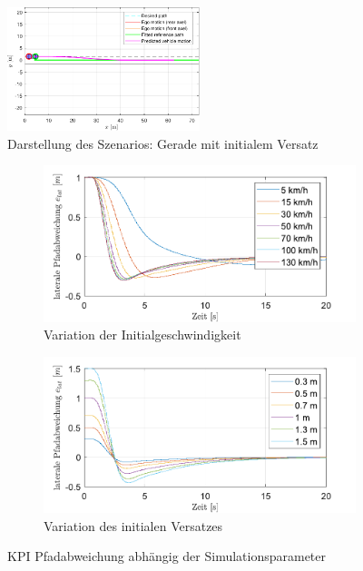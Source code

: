 \begin{figure}
    \centering
    \includegraphics[width=0.5\textwidth]{figures/3_Implementierung/Straight_Offset/test_straight_depiction.pdf}
    \caption{Darstellung des Szenarios: Gerade mit initialem Versatz}
    \label{fig:test_straight_depiction}
\end{figure}

\begin{figure}
    \centering
    \begin{subfigure}[b]{.49\textwidth}
        \centering
        \includegraphics[width=\textwidth]{figures/3_Implementierung/Straight_Offset/varVelo_1mOffset_s-Error.pdf}
        \caption{Variation der Initialgeschwindigkeit}
        \label{fig:varVelo_1mOffset_s-Error}
    \end{subfigure}
    \hfill
    \begin{subfigure}[b]{.49\textwidth}
        \centering
        \includegraphics[width=\textwidth]{figures/3_Implementierung/Straight_Offset/varOffset_50kmh_s-Error.pdf}
        \caption{Variation des initialen Versatzes}
        \label{fig:varOffset_50kmh_s-Error}
    \end{subfigure}
    \caption{KPI Pfadabweichung abhängig der Simulationsparameter}
    \label{fig:Straight_Offset_s-Error}
\end{figure}

